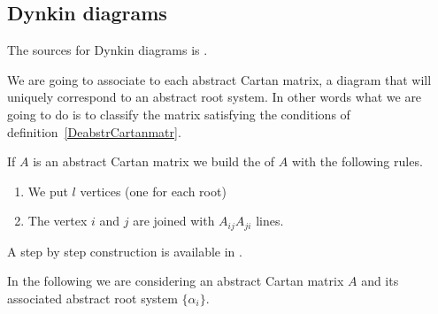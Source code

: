 \subsection{Dynkin diagrams}
\label{SubsecDynkindiam}

The sources for Dynkin diagrams is \cite{SternLieAlgebra,Wisser}.

We are going to associate to each abstract Cartan matrix, a diagram that will uniquely correspond to an abstract root system. In other words what we are going to do is to classify the matrix satisfying the conditions of definition~\ref{DeabstrCartanmatr}.

If \( A\) is an abstract Cartan matrix we build the  of \( A\) with the following rules.
\begin{enumerate}
	\item
	      We put \( l\) vertices (one for each root)
	\item
	      The vertex \( i\) and \( j\) are joined with \( A_{ij}A_{ji}\) lines.
\end{enumerate}
A step by step construction is available in \cite{Wisser}.

In the following we are considering an abstract Cartan matrix \( A\) and its associated abstract root system \( \{ \alpha_i \}\).

